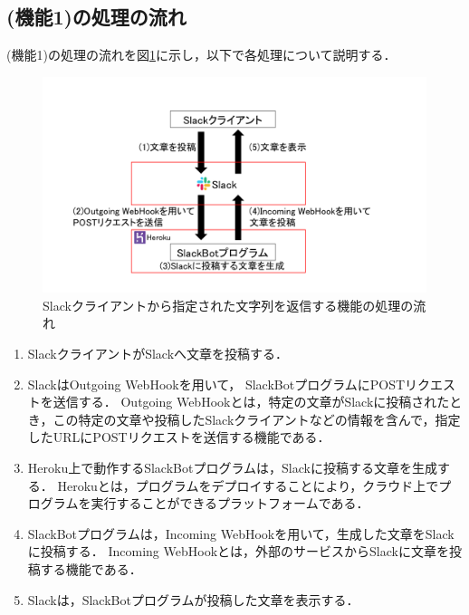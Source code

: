 \documentclass[12pt]{jsarticle}
\begin{document}
\subsection{(機能1)の処理の流れ}
(機能1)の処理の流れを図\ref{fig:slackbot_flow}に示し，以下で各処理について説明する．
  \begin{figure}[t]
    \centering
    \includegraphics[width=1\textwidth]{figs/slackbot_flow12.png}
    \caption{Slackクライアントから指定された文字列を返信する機能の処理の流れ}
    \label{fig:slackbot_flow}
  \end{figure}

\begin{enumerate}
\item SlackクライアントがSlackへ文章を投稿する．
\item SlackはOutgoing WebHookを用いて，%
  SlackBotプログラムにPOSTリクエストを送信する．
  Outgoing WebHookとは，特定の文章がSlackに投稿されたとき，この特定の文章や投稿したSlackクライアントなどの情報を含んで，指定したURLにPOSTリクエストを送信する機能である．
\item Heroku上で動作するSlackBotプログラムは，Slackに投稿する文章を生成する．
  Herokuとは，プログラムをデプロイすることにより，クラウド上でプログラムを実行することができるプラットフォームである．
\item SlackBotプログラムは，Incoming WebHookを用いて，生成した文章をSlackに投稿する．
  Incoming WebHookとは，外部のサービスからSlackに文章を投稿する機能である．
\item Slackは，SlackBotプログラムが投稿した文章を表示する．
\end{enumerate}
\end{document}
